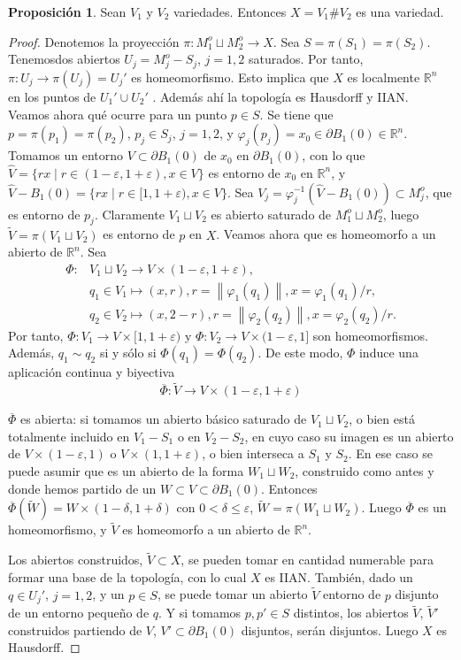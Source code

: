 \documentclass[10pt]{report}
\newcommand{\R}{\mathbb{R}}
\newcommand{\norm}[1]{\left\lVert#1\right\rVert} %
\theoremstyle{definition}
\newtheorem{prop}[defin]{Proposición}
\begin{document}
\begin{prop}%
Sean $V_1$ y $V_2$ variedades. Entonces $X=V_1\#V_2$ es una variedad.
\end{prop}
\begin{proof}
Denotemos la proyección $\pi:M_1^o\sqcup M_2^o\to X$. Sea $S=\pi (S_1)=\pi (S_2)$. Tenemosdos abiertos $U_j=M_j^o-S_j$, $j=1,2$ saturados. Por tanto, $\pi :U_ j\to \pi (U_j)=U_j'$ es homeomorfismo. Esto implica que $X$ es localmente $\R^n$ en los puntos de $U_1'\cup U_2'$ . Además ahí la topología es Hausdorff y IIAN.
Veamos ahora qué ocurre para un punto $p\in S$. Se tiene que $p=\pi (p_1)=\pi (p_2)$, $p_j\in S_j$, $j=1,2$, y $\varphi_j(p_j)=x_0 \in \partial B_1(0) \in \R^n$. Tomamos un entorno $V\subset \partial B_1(0)$ de $x_0$ en $\partial B_1(0)$, con lo que $\hat{V}=\{rx\mid   r\in (1-\varepsilon , 1+\varepsilon ), x\in V\}$ es entorno de $x_0$ en $\R^n$, y $\hat{V}-B_1(0)=\{rx\mid r\in [1, 1+\varepsilon ), x \in V\}$. Sea $V_j=\varphi_j^{-1}(\hat{V}-B_1(0))\subset M_j^o$, que es entorno de $p_j$. Claramente $V_1\sqcup V_2$ es abierto saturado de $M_1^o\sqcup M_2^o$, luego $\tilde{V}=\pi (V_1\sqcup V_2)$ es entorno de $p$ en $X$. Veamos ahora que es homeomorfo a un abierto de $\R^n$. Sea
\begin{align*}
\Phi : & V_1\sqcup V_2  \to  V\times (1-\varepsilon , 1+ \varepsilon ), \\
& q_1\in V_1  \mapsto  (x,r), r=\norm{\varphi_1(q_1)}, x=\varphi_1(q_1)/r,\\
& q_2\in V_2  \mapsto  (x,2-r), r= \norm{\varphi_2(q_2)}, x= \varphi_2(q_2)/r.
\end{align*}
Por tanto, $\Phi : V_1 \to V \times [1, 1+\varepsilon)$ y $\Phi : V_2 \to V \times (1- \varepsilon, 1]$ son homeomorfismos. Además, $q_1 \sim q_2$ si y sólo si $\Phi(q_1)=\Phi(q_2)$. De este modo, $\Phi$ induce una aplicación continua y biyectiva $$\overline{\Phi} : \tilde{V} \to V \times (1- \varepsilon, 1+ \varepsilon)$$

$\overline{\Phi}$ es abierta: si tomamos un abierto básico saturado de $V_1\sqcup V_2$, o bien está totalmente incluido en $V_1-S_1$ o en $V_2-S_2$, en cuyo caso su imagen es un abierto de $V\times (1-\varepsilon ,1)$ o $V\times (1,1+\varepsilon )$, o bien interseca a $S_1$ y $S_2$. En ese caso se puede asumir que es un abierto de la forma $W_1\sqcup W_2$, construido como antes y donde hemos partido de un $W\subset V \subset \partial B_1(0)$. Entonces $\overline{\Phi} (\tilde{W})= W \times (1-\delta , 1+\delta )$ con $0<\delta \leq \varepsilon$, $\tilde{W} = \pi (W_1 \sqcup W_2)$. Luego $\overline{\Phi}$ es un homeomorfismo, y $\tilde{V}$ es homeomorfo a un abierto de $\R^n$.

Los abiertos construidos, $\tilde{V} \subset X$, se pueden tomar en cantidad numerable para formar una base de la topología, con lo cual $X$ es IIAN. También, dado un $q\in U_j'$, $j=1,2$, y un $p\in S$, se puede tomar un abierto $\tilde{V}$ entorno de $p$ disjunto de un entorno pequeño de $q$. Y si tomamos $p, p' \in S$ distintos, los abiertos $\tilde{V}$, $\tilde{V}'$ construidos partiendo de $V$, $V'\subset \partial B_1(0)$ disjuntos, serán disjuntos. Luego $X$ es Hausdorff.
\end{proof}
\end{document}
